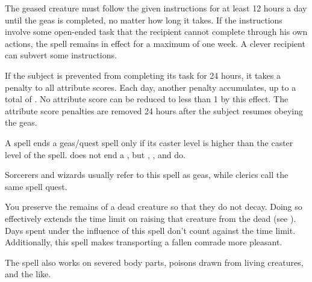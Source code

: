 The geased creature must follow the given instructions for at least 12 hours a day until the geas is completed, no matter how long it takes. If the instructions involve some open-ended task that the recipient cannot complete through his own actions, the spell remains in effect for a maximum of one week. A clever recipient can subvert some instructions.
\par If the subject is prevented from completing its task for 24 hours, it takes a  penalty to all attribute scores. Each day, another  penalty accumulates, up to a total of . No attribute score can be reduced to less than 1 by this effect. The attribute score penalties are removed 24 hours after the subject resumes obeying the geas.
\spellnotes \par A  spell ends a geas/quest spell only if its caster level is higher than the caster level of the  spell.  does not end a , but , , and  do.
\par Sorcerers and wizards usually refer to this spell as geas, while clerics call the same spell quest.

\spelleffect You preserve the remains of a dead creature so that they do not decay. Doing so effectively extends the time limit on raising that creature from the dead (see ). Days spent under the influence of this spell don't count against the time limit. Additionally, this spell makes transporting a fallen comrade more pleasant.
\par The spell also works on severed body parts, poisons drawn from living creatures, and the like.

